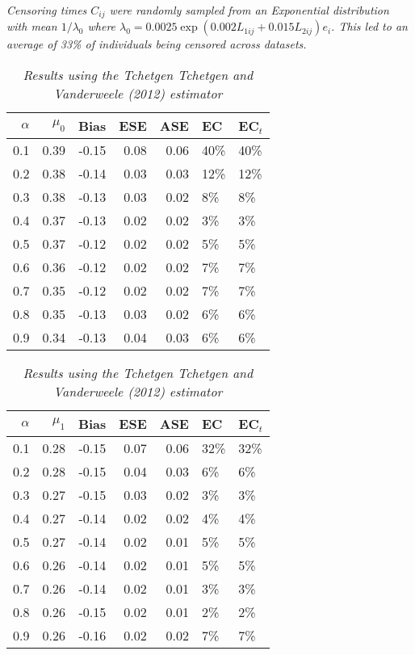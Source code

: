 \documentclass[12pt, letterpaper]{article}
\begin{document}
\begin{table}[ht!]
{	\textit{Censoring times $C_{ij}$ were randomly sampled from an Exponential distribution with mean $1/\lambda_0$ where $\lambda_0=0.0025\exp(0.002L_{1ij}+0.015L_{2ij})e_i$. This led to an average of 33\% of individuals being censored across datasets.} 	
}
\end{table}
\begin{table}[ht!]
	\centering
	\bgroup
	\def\arraystretch{1.25}
	\setlength\tabcolsep{0.05in}
	\begin{tabular}{rrrrrll}
		\hline
		$\alpha$ & $\mu_0$ & Bias & ESE & ASE & EC & EC$_t$ \\ \hline
		0.1 & 0.39 & -0.15 & 0.08 & 0.06 & 40\% & 40\% \\ 
		0.2 & 0.38 & -0.14 & 0.03 & 0.03 & 12\% & 12\% \\ 
		0.3 & 0.38 & -0.13 & 0.03 & 0.02 & 8\% & 8\% \\ 
		0.4 & 0.37 & -0.13 & 0.02 & 0.02 & 3\% & 3\% \\ 
		0.5 & 0.37 & -0.12 & 0.02 & 0.02 & 5\% & 5\% \\ 
		0.6 & 0.36 & -0.12 & 0.02 & 0.02 & 7\% & 7\% \\ 
		0.7 & 0.35 & -0.12 & 0.02 & 0.02 & 7\% & 7\% \\ 
		0.8 & 0.35 & -0.13 & 0.03 & 0.02 & 6\% & 6\% \\ 
		0.9 & 0.34 & -0.13 & 0.04 & 0.03 & 6\% & 6\% \\  
		\hline
	\end{tabular}
	\egroup
	\quad 
	\bgroup
	\setlength\tabcolsep{0.05in}
	\def\arraystretch{1.25}
	\begin{tabular}{rrrrrll}
		\hline
		$\alpha$ & $\mu_1$ & Bias & ESE & ASE & EC & EC$_t$ \\ \hline
		0.1 & 0.28 & -0.15 & 0.07 & 0.06 & 32\% & 32\% \\ 
		0.2 & 0.28 & -0.15 & 0.04 & 0.03 & 6\% & 6\% \\ 
		0.3 & 0.27 & -0.15 & 0.03 & 0.02 & 3\% & 3\% \\ 
		0.4 & 0.27 & -0.14 & 0.02 & 0.02 & 4\% & 4\% \\ 
		0.5 & 0.27 & -0.14 & 0.02 & 0.01 & 5\% & 5\% \\ 
		0.6 & 0.26 & -0.14 & 0.02 & 0.01 & 5\% & 5\% \\ 
		0.7 & 0.26 & -0.14 & 0.02 & 0.01 & 3\% & 3\% \\ 
		0.8 & 0.26 & -0.15 & 0.02 & 0.01 & 2\% & 2\% \\ 
		0.9 & 0.26 & -0.16 & 0.02 & 0.02 & 7\% & 7\% \\ 
		\hline
	\end{tabular}
	\egroup
	\caption*{
		\textit{Results using the Tchetgen Tchetgen and Vanderweele (2012) estimator}	
	}
\end{table}
\end{document}
